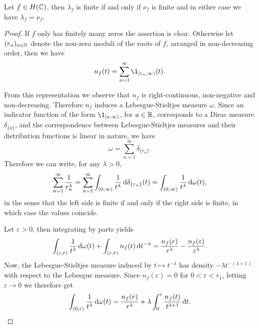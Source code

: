 \begin{proposition} \label{prop:zeros-order-equals-zeros-exponent}
    Let $f \in H(\mathbb{C})$, then $\lambda_f$ is finite if and only if $\nu_f$ is finite and in either case we have $\lambda_f = \nu_f$.
\end{proposition}

\begin{proof}
    If $f$ only has finitely many zeros the assertion is clear. Otherwise let $(r_n)_{n \in \mathbb{N}}$ denote the non-zero moduli of the roots of $f$, arranged in non-decreasing order, then we have
    $$ n_f(t) = \sum_{n=1}^\infty \1_{[r_n, \infty)}(t). $$

    From this representation we observe that $n_f$ is right-continuous, non-negative and non-decreasing. Therefore $n_f$ induces a Lebesgue-Stieltjes measure $\omega$. Since an indicator function of the form $\1_{[a, \infty)}$, for $a \in \mathbb{R}$, corresponds to a Dirac measure $\delta_{\{ a \}}$, and the correspondence between Lebesgue-Stieltjes measures and their distribution functions is linear in nature, we have
    $$ \omega = \sum_{n = 1}^\infty \delta_{\{r_n\}}. $$
    Therefore we can write, for any $\lambda > 0$,
    \begin{equation} \label{eq:zeros-order-equals-zeros-exponent:series-integral}
        \sum_{n=1}^\infty \frac{1}{r_n^\lambda} = \sum_{n=1}^\infty \int_{(0, \infty)} \frac{1}{t^\lambda} \mathop{}\!\mathrm{d} \delta_{\{r_n\}}(t) = \int_{(0, \infty)} \frac{1}{t^\lambda} \mathop{}\!\mathrm{d} \omega(t),
    \end{equation}
    in the sense that the left side is finite if and only if the right side is finite, in which case the values coincide.
    
    Let $\varepsilon > 0$, then integrating by parts yields
    $$ \int_{(\varepsilon, r)} \frac{1}{t^\lambda} \mathop{}\!\mathrm{d} \omega(t) + \int_{(\varepsilon, r)} n_f(t) \mathop{}\!\mathrm{d} t^{-\lambda} = \frac{n_f(r)}{r^\lambda} - \frac{n_f(\varepsilon)}{\varepsilon^\lambda}. $$
    Now, the Lebesgue-Stieltjes measure induced by $t \mapsto t^{-\lambda}$ has density $-\lambda t^{-(\lambda + 1)}$ with respect to the Lebesgue measure. Since $n_f(\varepsilon) = 0$ for $0 < \varepsilon < r_1$, letting $\varepsilon \to 0$ we therefore get
    \begin{equation} \label{eq:zeros-order-equals-zeros-exponent:integration-by-parts}
        \int_{(0, r)} \frac{1}{t^\lambda} \mathop{}\!\mathrm{d} \omega(t) = \frac{n_f(r)}{r^\lambda} + \lambda \int_0^r \frac{n_f(t)}{t^{\lambda + 1}} \mathop{}\!\mathrm{d} t.
    \end{equation}


\end{proof}
